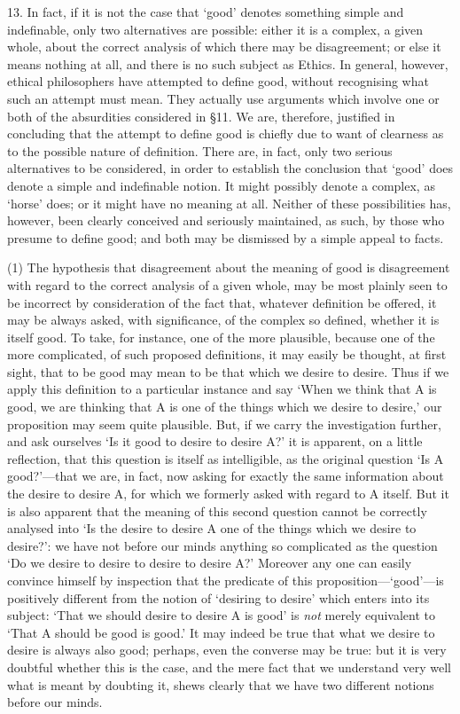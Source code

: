 13. In fact, if it is not the case that `good' denotes something
simple and indefinable, only two alternatives are possible: either it
is a complex, a given whole, about the correct analysis of which there
may be disagreement; or else it means nothing at all, and there is no
such subject as Ethics. In general, however, ethical philosophers have
attempted to define good, without recognising what such an attempt
must mean. They actually use arguments which involve one or both of
the absurdities considered in \S11. We are, therefore, justified in
concluding that the attempt to define good is chiefly due to want of
clearness as to the possible nature of definition. There are, in fact,
only two serious alternatives to be considered, in order to establish
the conclusion that `good' does denote a simple and indefinable
notion. It might possibly denote a complex, as `horse' does; or it
might have no meaning at all. Neither of these possibilities has,
however, been clearly conceived and seriously maintained, as such, by
those who presume to define good; and both may be dismissed by a
simple appeal to facts.

(1) The hypothesis that disagreement about the meaning of good is
disagreement with regard to the correct analysis of a given whole, may
be most plainly seen to be incorrect by consideration of the fact
that, whatever definition be offered, it may be always asked, with
significance, of the complex so defined, whether it is itself good. To
take, for instance, one of the more plausible, because one of the more
complicated, of such proposed definitions, it may easily be thought,
at first sight, that to be good may mean to be that which we desire to
desire. Thus if we apply this definition to a particular instance and
say `When we think that A is good, we are thinking that A is one of
the things which we desire to desire,' our proposition may seem quite
plausible. But, if we carry the investigation further, and ask
ourselves `Is it good to desire to desire A?' it is apparent, on a
little reflection, that this question is itself as intelligible, as
the original question `Is A good?'---that we are,  in fact,
now asking for exactly the same information about the desire to desire
A, for which we formerly asked with regard to A itself. But it is also
apparent that the meaning of this second question cannot be correctly
analysed into `Is the desire to desire A one of the things which we
desire to desire?': we have not before our minds anything so
complicated as the question `Do we desire to desire to desire to
desire A?' Moreover any one can easily convince himself by inspection
that the predicate of this proposition---`good'---is positively
different from the notion of `desiring to desire' which enters into
its subject: `That we should desire to desire A is good' is
\textit{not} merely equivalent to `That A should be good is good.' It
may indeed be true that what we desire to desire is always also good;
perhaps, even the converse may be true: but it is very doubtful
whether this is the case, and the mere fact that we understand very
well what is meant by doubting it, shews clearly that we have two
different notions before our minds.

